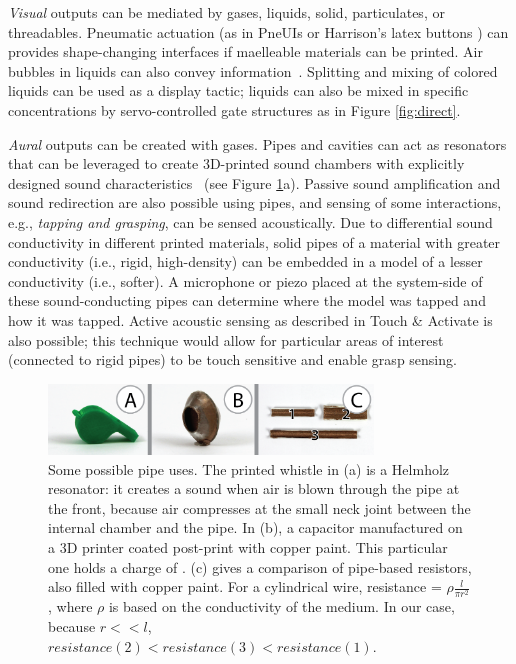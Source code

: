 \emph{Visual} outputs can be mediated by gases, liquids, solid, particulates, or threadables.  Pneumatic actuation (as in PneUIs \cite{Yao-pneui} or Harrison's latex buttons \cite{Harrison-buttons}) can provides shape-changing interfaces if maelleable materials can be printed. 
Air bubbles in liquids can also convey information~\cite{Heiner1999Percolator}. Splitting and mixing of colored liquids can be used as a display tactic; liquids can also be mixed in specific concentrations by servo-controlled gate structures as in Figure \ref{fig:direct}. %

\emph{Aural} outputs can be created with gases.  Pipes and cavities can act as resonators that can be leveraged to create 3D-printed sound chambers with explicitly designed sound characteristics~\cite{Zoran-flute} (see Figure \ref{fig:speculative}a).  %
Passive sound amplification and sound redirection are also possible using pipes, and sensing of some interactions, e.g., \emph{tapping and grasping}, can be sensed acoustically.  Due to differential sound conductivity in different printed materials, solid pipes of a material with greater conductivity (i.e., rigid, high-density) can be embedded in a model of a lesser conductivity (i.e., softer).  A microphone or piezo placed at the system-side of these sound-conducting pipes can determine where the model was tapped and how it was tapped.  Active acoustic sensing as described in Touch \& Activate \cite{Ono-touchandactivate} is also possible; this technique would allow for particular areas of interest (connected to rigid pipes) to be touch sensitive and enable grasp sensing.

\begin{figure}[h]
\centering
    \includegraphics[width=3.4in]{figures/speculative.png}
\caption{Some possible pipe uses.  The printed whistle in (a) is a Helmholz resonator: it creates a sound when air is blown through the pipe at the front, because air compresses at the small neck joint between the internal chamber and the pipe.  In (b), a capacitor manufactured on a 3D printer coated post-print with copper paint.  This particular one holds a charge of .  (c) gives a comparison of pipe-based resistors, also filled with copper paint.  For a cylindrical wire, resistance = $\rho\frac{l}{\pi r^2}$, where $\rho$ is based on the conductivity of the medium.  In our case, because $r << l$, $resistance(2) < resistance(3) < resistance(1)$.}
\label{fig:speculative}
\end{figure}


